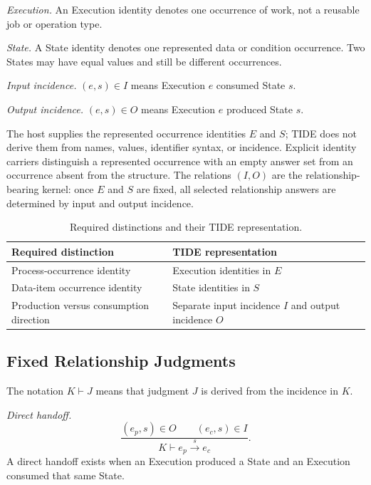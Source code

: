 \documentclass[conference]{IEEEtran}
\theoremstyle{tideproposition}
\newcommand{\direct}[3]{#1\xrightarrow{#2}#3}
\begin{document}
\emph{Execution.} An Execution identity denotes one occurrence of work, not a reusable job or operation type.

\emph{State.} A State identity denotes one represented data or condition occurrence. Two States may have equal values and still be different occurrences.

\emph{Input incidence.} $(e,s)\in I$ means Execution $e$ consumed State $s$.

\emph{Output incidence.} $(e,s)\in O$ means Execution $e$ produced State $s$.

The host supplies the represented occurrence identities $E$ and $S$; TIDE does not derive them from names, values, identifier syntax, or incidence. Explicit identity carriers distinguish a represented occurrence with an empty answer set from an occurrence absent from the structure. The relations $(I,O)$ are the relationship-bearing kernel: once $E$ and $S$ are fixed, all selected relationship answers are determined by input and output incidence.

\begin{table}[H]
\caption{Required distinctions and their TIDE representation.}
\label{tab:tide-representation}
\centering
\footnotesize
\setlength{\tabcolsep}{2.5pt}
\begin{tabularx}{\columnwidth}{@{}Y Y@{}}
\toprule
Required distinction & TIDE representation\\
\midrule
Process-occurrence identity & Execution identities in $E$\\
Data-item occurrence identity & State identities in $S$\\
Production versus consumption direction & Separate input incidence $I$ and output incidence $O$\\
\bottomrule
\end{tabularx}
\end{table}

\subsection{Fixed Relationship Judgments}
The notation $K\vdash J$ means that judgment $J$ is derived from the incidence in $K$.

\emph{Direct handoff.}
\begin{equation}
\frac{(e_p,s)\in O\qquad(e_c,s)\in I}
     {K\vdash\direct{e_p}{s}{e_c}}.
\end{equation}
A direct handoff exists when an Execution produced a State and an Execution consumed that same State.
\end{document}
